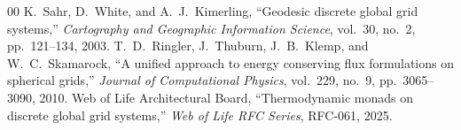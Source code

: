 \documentclass[10pt,journal,compsoc]{IEEEtran}
\begin{document}
\begin{thebibliography}{00}
 K.~Sahr, D.~White, and A.~J.~Kimerling, ``Geodesic discrete global grid systems,'' \textit{Cartography and Geographic Information Science}, vol.~30, no.~2, pp.~121--134, 2003.
 T.~D.~Ringler, J.~Thuburn, J.~B.~Klemp, and W.~C.~Skamarock, ``A unified approach to energy conserving flux formulations on spherical grids,'' \textit{Journal of Computational Physics}, vol.~229, no.~9, pp.~3065--3090, 2010.
 Web of Life Architectural Board, ``Thermodynamic monads on discrete global grid systems,'' \textit{Web of Life RFC Series}, RFC-061, 2025.
\end{thebibliography}
\end{document}
